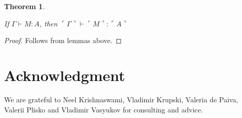 \documentclass[a4paper]{article}
\newtheorem{theorem}{Theorem}
\begin{document}
\begin{theorem}
  $ $

  If $\Gamma \vdash M : A$, then $\ulcorner \Gamma \urcorner \vdash \ulcorner M \urcorner : \ulcorner A \urcorner$
\end{theorem}

\begin{proof}
  Follows from lemmas above.
\end{proof}


\section{Acknowledgment}

  We are grateful to Neel Krishnaswami, Vladimir Krupski, Valeria de Paiva, Valerii Plisko and Vladimir Vasyukov for consulting and advice.

\end{document}
